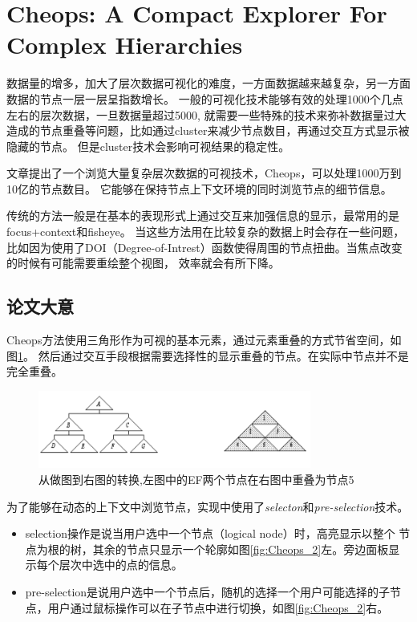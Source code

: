 \documentclass{article}
\begin{document}
\section{Cheops: A Compact Explorer For Complex Hierarchies\cite{Beaudoin1996}}
数据量的增多，加大了层次数据可视化的难度，一方面数据越来越复杂，另一方面数据的节点一层一层呈指数增长。
一般的可视化技术能够有效的处理1000个几点左右的层次数据，一旦数据量超过5000,
就需要一些特殊的技术来弥补数据量过大造成的节点重叠等问题，比如通过cluster来减少节点数目，再通过交互方式显示被隐藏的节点。
但是cluster技术会影响可视结果的稳定性。

文章提出了一个浏览大量复杂层次数据的可视技术，Cheops，可以处理1000万到10亿的节点数目。
它能够在保持节点上下文环境的同时浏览节点的细节信息。

传统的方法一般是在基本的表现形式上通过交互来加强信息的显示，最常用的是focus+context和fisheye。
当这些方法用在比较复杂的数据上时会存在一些问题，
比如因为使用了DOI（Degree-of-Intrest）函数使得周围的节点扭曲。当焦点改变的时候有可能需要重绘整个视图，
效率就会有所下降。

\subsection{论文大意}
Cheops方法使用三角形作为可视的基本元素，通过元素重叠的方式节省空间，如图\ref{fig:Cheops_1}。
然后通过交互手段根据需要选择性的显示重叠的节点。在实际中节点并不是完全重叠。

\begin{figure}[h]
  \centering
  \includegraphics[width=0.8\textwidth]{_img/Cheops_1.png}
  \caption{从做图到右图的转换,左图中的EF两个节点在右图中重叠为节点5}
  \label{fig:Cheops_1}
\end{figure}

为了能够在动态的上下文中浏览节点，实现中使用了\emph{selecton}和\emph{pre-selection}技术。

\begin{itemize}
\item selection操作是说当用户选中一个节点（logical node）时，高亮显示以整个
  节点为根的树，其余的节点只显示一个轮廓如图\ref{fig:Cheops_2}左。旁边面板显示每个层次中选中的点的信息。
\item pre-selection是说用户选中一个节点后，随机的选择一个用户可能选择的子节
  点，用户通过鼠标操作可以在子节点中进行切换，如图\ref{fig:Cheops_2}右。
\end{itemize}
\end{document}
